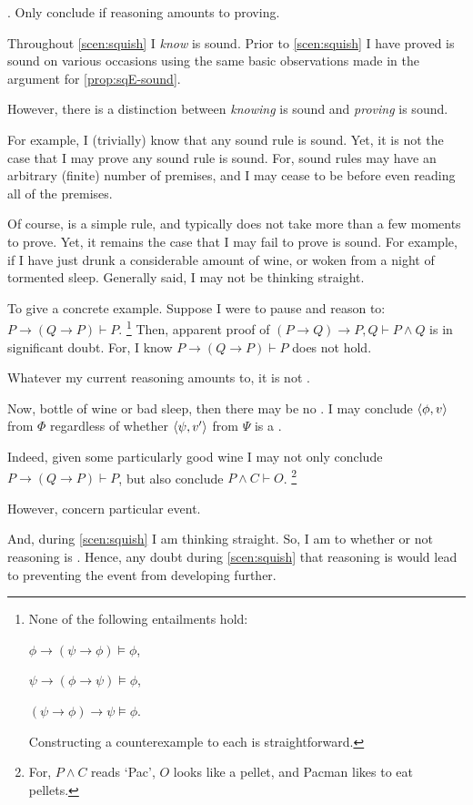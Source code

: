 \begin{note}
  .
  Only conclude if reasoning amounts to proving.

  Throughout \autoref{scen:squish} I \emph{know} \sqE{} is sound.
  Prior to \autoref{scen:squish} I have proved \sqE{} is sound on various occasions using the same basic observations made in the argument for \autoref{prop:sqE-sound}.

  However, there is a distinction between \emph{knowing} \sqE{} is sound and \emph{proving} \sqE{} is sound.

  For example, I (trivially) know that any sound rule is sound.
  Yet, it is not the case that I may prove any sound rule is sound.
  For, sound rules may have an arbitrary (finite) number of premises, and I may cease to be before even reading all of the premises.

  Of course, \sqE{} is a simple rule, and typically does not take more than a few moments to prove.
  Yet, it remains the case that I may fail to prove \sqE{} is sound.
  For example, if I have just drunk a considerable amount of wine, or woken from a night of tormented sleep.
  Generally said, I may not be thinking straight.

  To give a concrete example.
  Suppose I were to pause and reason to:
  \(P \rightarrow (Q \rightarrow P) \vdash P\).%
  \footnote{
    None of the following entailments hold:
    \begin{enumerate*}[noitemsep, label=]
    \item
      \(\phi \rightarrow (\psi \rightarrow \phi) \vDash \phi\),
    \item
      \(\psi \rightarrow (\phi \rightarrow \psi) \vDash \phi\),
    \item
      \((\psi \rightarrow \phi) \rightarrow \psi \vDash \phi\).
    \end{enumerate*}
    Constructing a counterexample to each is straightforward.
  }
  Then, apparent proof of \((P \rightarrow Q) \rightarrow P, Q \vdash P \land Q\) is in significant doubt.
  For, I know \(P \rightarrow (Q \rightarrow P) \vdash P\) does not hold.

  Whatever my current reasoning amounts to, it is not \tR{}.
\end{note}

\begin{note}
  Now, bottle of wine or bad sleep, then there may be no .
  I may conclude \(\langle \phi, v \rangle\) from \(\Phi\) regardless of whether \(\langle \psi, v' \rangle\) from \(\Psi\) is a \fc{}.

  Indeed, given some particularly good wine I may not only conclude \(P \rightarrow (Q \rightarrow P) \vdash P\), but also conclude \(P \land C \vdash O\).%
  \footnote{
    For, \(P \land C\) reads `Pac', \(O\) looks like a pellet, and Pacman likes to eat pellets.
  }

  However,  concern particular event.

  And, during \autoref{scen:squish} I am thinking straight.
  So, I am  to whether or not reasoning is .
  Hence, any doubt during \autoref{scen:squish} that reasoning is  would lead to preventing the event from developing further.
\end{note}

